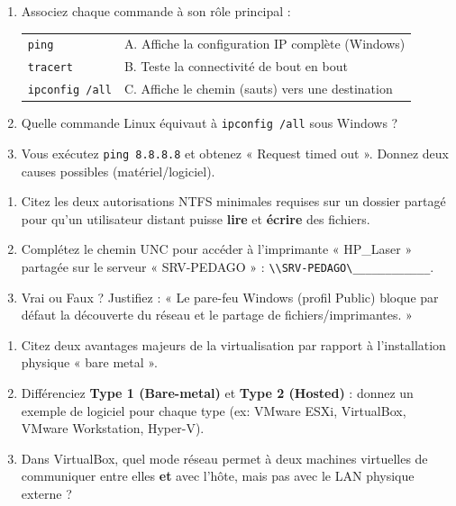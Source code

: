 \documentclass[11pt]{article}
\begin{document}
\begin{exercice}
\begin{enumerate}
    \item Associez chaque commande à son rôle principal :
    \begin{tabular}{ll}
        \texttt{ping} & A. Affiche la configuration IP complète (Windows) \\
        \texttt{tracert} & B. Teste la connectivité de bout en bout \\
        \texttt{ipconfig /all} & C. Affiche le chemin (sauts) vers une destination \\
    \end{tabular}
    \item Quelle commande Linux équivaut à \texttt{ipconfig /all} sous Windows ?
    \item Vous exécutez \texttt{ping 8.8.8.8} et obtenez « Request timed out ». Donnez deux causes possibles (matériel/logiciel).
\end{enumerate}
\end{exercice}

\begin{exercice}
\begin{enumerate}
    \item Citez les deux autorisations NTFS minimales requises sur un dossier partagé pour qu'un utilisateur distant puisse \textbf{lire} et \textbf{écrire} des fichiers.
    \item Complétez le chemin UNC pour accéder à l'imprimante « HP\_Laser » partagée sur le serveur « SRV-PEDAGO » : \texttt{\textbackslash\textbackslash SRV-PEDAGO\textbackslash \_\_\_\_\_\_\_\_\_\_\_\_}.
    \item Vrai ou Faux ? Justifiez : « Le pare-feu Windows (profil Public) bloque par défaut la découverte du réseau et le partage de fichiers/imprimantes. »
\end{enumerate}
\end{exercice}

\begin{exercice}
\begin{enumerate}
    \item Citez deux avantages majeurs de la virtualisation par rapport à l'installation physique « bare metal ».
    \item Différenciez \textbf{Type 1 (Bare-metal)} et \textbf{Type 2 (Hosted)} : donnez un exemple de logiciel pour chaque type (ex: VMware ESXi, VirtualBox, VMware Workstation, Hyper-V).
    \item Dans VirtualBox, quel mode réseau permet à deux machines virtuelles de communiquer entre elles \textbf{et} avec l'hôte, mais pas avec le LAN physique externe ?
\end{enumerate}
\end{exercice}
\end{document}
